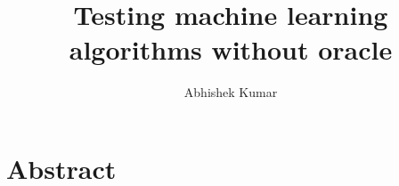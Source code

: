 \documentclass[12pt]{report}
\begin{document}
	\author{Abhishek Kumar}
	\title{Testing machine learning algorithms without oracle}
	\maketitle

	\chapter{Abstract}
	\nocite{*}
	
	
	
\end{document}
